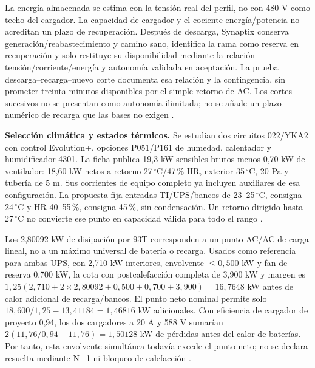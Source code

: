 

La energía almacenada se estima con la tensión real del perfil, no con 480 V como techo del cargador. La capacidad de cargador y el cociente energía/potencia no acreditan un plazo de recuperación. Después de descarga, Synaptix conserva generación/reabastecimiento y camino sano, identifica la rama como reserva en recuperación y solo restituye su disponibilidad mediante la relación tensión/corriente/energía y autonomía validada en aceptación. La prueba descarga--recarga--nuevo corte documenta esa relación y la contingencia, sin prometer treinta minutos disponibles por el simple retorno de AC. Los cortes sucesivos no se presentan como autonomía ilimitada; no se añade un plazo numérico de recarga que las bases no exigen \parencites[RT-06.07/08, p.~15]{pucv-transversal}{csbManualJunio2025}{p7-eaton-93t-guia}.

\textbf{Selección climática y estados térmicos.} Se estudian dos circuitos 022/YKA2 con control Evolution+, opciones P051/P161 de humedad, calentador y humidificador 4301. La ficha publica 19,3 kW sensibles brutos menos 0,70 kW de ventilador: 18,60 kW netos a retorno 27\,$^{\circ}$C/47\,\% HR, exterior 35\,$^{\circ}$C, 20 Pa y tubería de 5 m. Sus corrientes de equipo completo ya incluyen auxiliares de esa configuración. La propuesta fija entradas TI/UPS/bancos de 23--25\,$^{\circ}$C, consigna 24\,$^{\circ}$C y HR 40--55\,\%, consigna 45\,\%, sin condensación. Un retorno dirigido hasta 27\,$^{\circ}$C no convierte ese punto en capacidad válida para todo el rango \parencites[p.~3]{p6-mext-pi-2025}{p6-mext-databook}{p6-mext-control-me38}.

Los 2,80092 kW de disipación por 93T corresponden a un punto AC/AC de carga lineal, no a un máximo universal de batería o recarga. Usados como referencia para ambas UPS, con 2,710 kW interiores, envolvente $\leq0,500$ kW y fan de reserva 0,700 kW, la cota con postcalefacción completa de 3,900 kW y margen es $1,25(2,710+2\times2,80092+0,500+0,700+3,900)=16,7648$ kW antes de calor adicional de recarga/bancos. El punto neto nominal permite solo $18,600/1,25-13,41184=1,46816$ kW adicionales. Con eficiencia de cargador de proyecto 0,94, los dos cargadores a 20 A y 588 V sumarían $2(11,76/0,94-11,76)=1,50128$ kW de pérdidas antes del calor de baterías. Por tanto, esta envolvente simultánea todavía excede el punto neto; no se declara resuelta mediante N+1 ni bloqueo de calefacción \parencites[p.~4]{p7-eaton-93t-tecnica}[p.~3]{p6-mext-pi-2025}.

